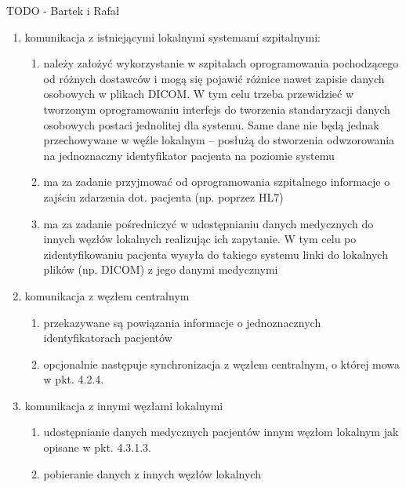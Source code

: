 \documentclass[a4paper]{report}
\begin{document}
TODO - Bartek i Rafał
\begin{enumerate}
\item komunikacja z istniejącymi lokalnymi systemami szpitalnymi:
  \begin{enumerate}
  \item należy założyć wykorzystanie w szpitalach oprogramowania pochodzącego od różnych dostawców i mogą się pojawić różnice nawet zapisie danych osobowych w plikach DICOM. W tym celu trzeba przewidzieć w tworzonym oprogramowaniu interfejs do tworzenia standaryzacji danych osobowych postaci jednolitej dla systemu. Same dane nie będą jednak przechowywane w węźle lokalnym – posłużą do stworzenia odwzorowania na jednoznaczny identyfikator pacjenta na poziomie systemu
  \item ma za zadanie przyjmować od oprogramowania szpitalnego informacje o zajściu zdarzenia dot.
        pacjenta (np. poprzez HL7)
  \item ma za zadanie pośredniczyć w udostępnianiu danych medycznych do innych węzłów lokalnych realizując
        ich zapytanie. W tym celu po zidentyfikowaniu pacjenta wysyła do takiego systemu linki do lokalnych
        plików (np. DICOM) z jego danymi medycznymi
  \end{enumerate}

\item komunikacja z węzłem centralnym
  \begin{enumerate}
  \item przekazywane są powiązania informacje o jednoznacznych identyfikatorach pacjentów
  \item opcjonalnie następuje synchronizacja z węzłem centralnym, o której mowa w pkt. 4.2.4.
  \end{enumerate}

\item komunikacja z innymi węzłami lokalnymi
  \begin{enumerate}
  \item udostępnianie danych medycznych pacjentów innym węzłom lokalnym jak opisane w pkt.  4.3.1.3.
  \item pobieranie danych z innych węzłów lokalnych
  \end{enumerate}

\end{enumerate}
\end{document}
